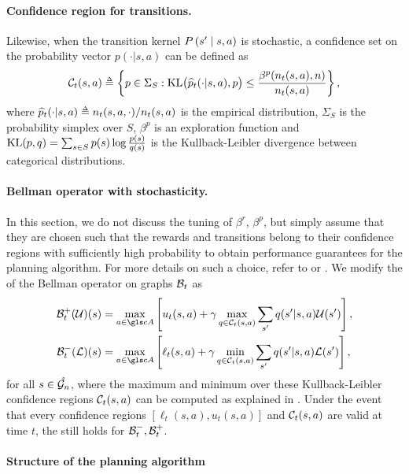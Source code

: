 \paragraph{Confidence region for transitions.}

Likewise, when the transition kernel $P\left(s' \;\middle|\; s,a\right)$ is stochastic, a confidence set on the probability vector $p(\cdot|s,a)$ can be defined as
$$\cC_t(s,a) \eqdef \left\{p\in \Sigma_S :  \KL\!\big(\hp_t(\cdot|s,a),p\big) \leq \frac {\beta^p(n_t(s,a), n)} {n_t(s,a)}\right\},$$
where $\hp_t(\cdot|s,a) \eqdef n_t(s,a,\cdot) / n_t(s,a)$ is the empirical distribution, $\Sigma_S$ is the probability simplex over $S$, $\beta^p$ is an exploration function and $\operatorname{KL}(p,q)= \sum_{s \in S}  p(s) \log \tfrac{ p(s)} {{q}(s)}$ is the Kullback-Leibler divergence between categorical distributions.

\paragraph{Bellman operator with stochasticity.}

In this section, we do not discuss the tuning of $\beta^r$, $\beta^p$, but simply assume that they are chosen such that the rewards and transitions belong to their confidence regions with sufficiently high probability to obtain performance guarantees for the  planning algorithm. For more details on such a choice, refer to  or \citep[\eg][]{Jonsson2020planning}. We modify the  of the Bellman operator on graphs $\mathcal{B}_t$ as
\begin{align*}
\cB_t^+(\cU)(s) &= \max_{a\in \cA} \left[u_t(s,a) + \gamma \max_{q \in \cC_t(s,a)} \sum_{s'} q(s'|s,a) \cU(s')\right], \\
\cB_t^-(\cL)(s) &= \max_{a\in \cA} \left[\ell_t(s,a) + \gamma \min_{q \in \cC_t(s,a)} \sum_{s'} q(s'|s,a)\cL(s')\right],
\end{align*}
for all $s\in\mathring{\mathcal{G}_n}$, where the maximum and minimum over these Kullback-Leibler confidence regions $\mathcal{C}_t(s,a)$ can be computed as explained in \citep[Appendix A of][]{Filippi2010optimism}. Under the event that every confidence regions $[\ell_t(s,a), u_t(s,a)]$ and $\mathcal{C}_t(s,a)$ are valid at time $t$, the  still holds for $\mathcal{B}_t^-, \mathcal{B}_t^+$.

\paragraph{Structure of the planning algorithm}

